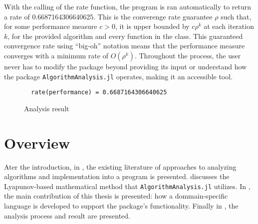 With the calling of the rate function, the program is ran automatically to return a rate of 0.6687164306640625. This is the converenge rate guarantee $\rho$ such that, for some performance measure $c>0$, it is upper bounded by $c \rho^k$ at each iteration $k$, for the provided algorithm and every function in the class. This guaranteed convergence rate using ``big-oh'' notation means that the performance measure converges with a minimum rate of $O(\rho^k)$. Throughout the process, the user never has to modify the package beyond providing its input or understand how the package \texttt{AlgorithmAnalysis.jl} operates, making it an accessible tool.

\begin{figure}[hbtp]
  \begin{lstlisting}
  rate(performance) = 0.6687164306640625
  \end{lstlisting}
  \caption{Analysis result}
  \label{ex_result}
\end{figure}

\section{Overview} \label{sectionOverview}



Ater the introduction, in , the existing literature of approaches to analyzing algorithms and implementation into a program is presented.  discusses the Lyapunov-based mathematical method that \texttt{AlgorithmAnalysis.jl} utilizes. In , the main contribution of this thesis is presented: how a dommain-specific language is developed to support the package's functionality. Finally in , the analysis process and result are presented.

